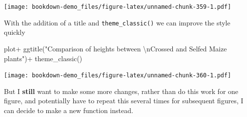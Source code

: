 \documentclass[
]{book}
\newenvironment{Shaded}{\begin{snugshade}}{\end{snugshade}}
\newcommand{\FunctionTok}[1]{\textcolor[rgb]{0.00,0.00,0.00}{#1}}
\newcommand{\NormalTok}[1]{#1}
\newcommand{\SpecialCharTok}[1]{\textcolor[rgb]{0.00,0.00,0.00}{#1}}
\newcommand{\StringTok}[1]{\textcolor[rgb]{0.31,0.60,0.02}{#1}}
\begin{document}
\texttt{[image: bookdown-demo\_files/figure-latex/unnamed-chunk-359-1.pdf]}

With the addition of a title and \texttt{theme\_classic()} we can improve the style quickly

\begin{Shaded}
\begin{Highlighting}[]
\NormalTok{plot}\SpecialCharTok{+}
  \FunctionTok{ggtitle}\NormalTok{(}\StringTok{"Comparison of heights between }\SpecialCharTok{\textbackslash{}n}\StringTok{Crossed and Selfed Maize plants"}\NormalTok{)}\SpecialCharTok{+}
  \FunctionTok{theme\_classic}\NormalTok{()}
\end{Highlighting}
\end{Shaded}

\texttt{[image: bookdown-demo\_files/figure-latex/unnamed-chunk-360-1.pdf]}

But I \textbf{still} want to make some more changes, rather than do this work for one figure, and potentially have to repeat this several times for subsequent figures, I can decide to make a new function instead.
\end{document}
